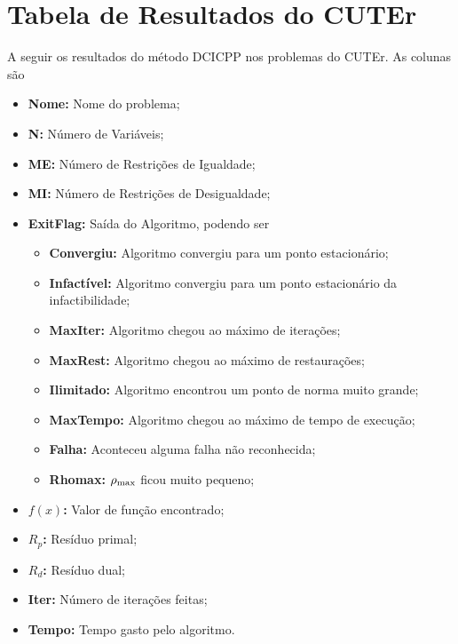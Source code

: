 \chapter{Tabela de Resultados do CUTEr}
A seguir os resultados do método DCICPP nos problemas do CUTEr.
As colunas são
\begin{itemize}
  \item {\bf Nome:} Nome do problema;
  \item {\bf N:} Número de Variáveis;
  \item {\bf ME:} Número de Restrições de Igualdade;
  \item {\bf MI:} Número de Restrições de Desigualdade;
  \item {\bf ExitFlag:} Saída do Algoritmo, podendo ser
  \begin{itemize}
    \item {\bf Convergiu:} Algoritmo convergiu para um ponto estacionário;
    \item {\bf Infactível:} Algoritmo convergiu para um ponto estacionário da
             infactibilidade;
    \item {\bf MaxIter:} Algoritmo chegou ao máximo de iterações;
    \item {\bf MaxRest:} Algoritmo chegou ao máximo de restaurações;
    \item {\bf Ilimitado:} Algoritmo encontrou um ponto de norma muito grande;
    \item {\bf MaxTempo:} Algoritmo chegou ao máximo de tempo de execução;
    \item {\bf Falha:} Aconteceu alguma falha não reconhecida;
    \item {\bf Rhomax:} $\rho_{\max}$ ficou muito pequeno;
  \end{itemize}
  \item {\bf $f(x)$:} Valor de função encontrado;
  \item {\bf $R_p$:} Resíduo primal;
  \item {\bf $R_d$:} Resíduo dual;
  \item {\bf Iter:} Número de iterações feitas;
  \item {\bf Tempo:} Tempo gasto pelo algoritmo.
\end{itemize}
\scriptsize
